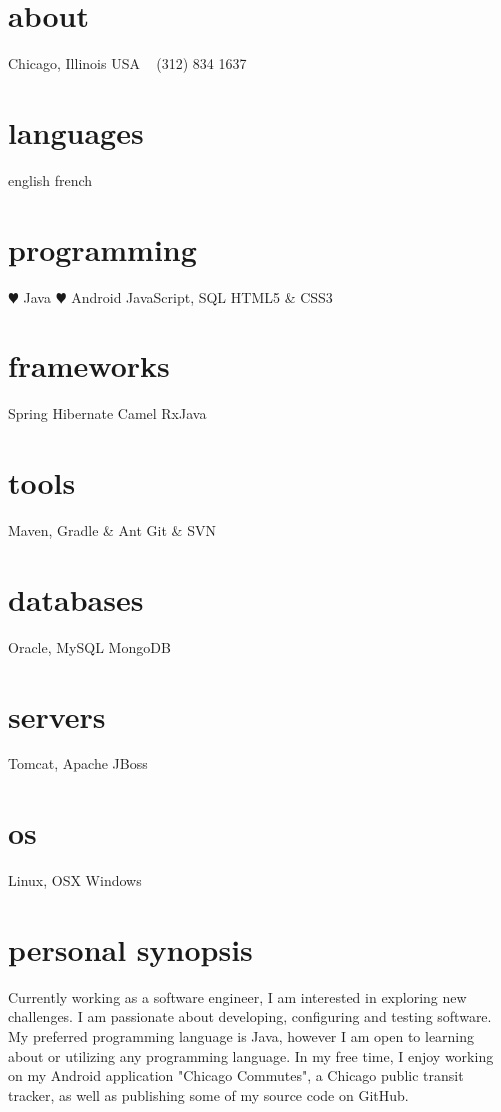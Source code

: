 \documentclass[]{friggeri-cv} %
\begin{document}



\begin{aside} %
\section{about}
Chicago, Illinois
USA
~
(312) 834 1637
~
\section{languages}
english
french
\section{programming}
{\color{red} $\varheartsuit$} Java
{\color{red} $\varheartsuit$} Android
JavaScript, SQL
HTML5 \& CSS3
\section{frameworks}
Spring
Hibernate
Camel
RxJava
\section{tools}
Maven, Gradle \& Ant
Git \& SVN
\section{databases}
Oracle, MySQL
MongoDB
\section{servers}
Tomcat, Apache
JBoss
\section{os}
Linux, OSX
Windows
\end{aside}

\section{personal synopsis}

Currently working as a software engineer, I am interested in exploring new challenges. I am passionate about developing, configuring and testing software. My preferred programming language is Java, however I am open to learning about or utilizing any programming language. In my free time, I enjoy working on my Android application "Chicago Commutes", a Chicago public transit tracker, as well as publishing some of my source code on GitHub.
\end{document}
